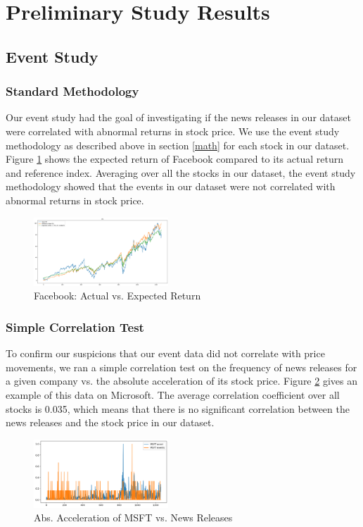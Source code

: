 \documentclass[conference]{IEEEtran}
\begin{document}
\section{Preliminary Study Results}
\subsection{Event Study}
\subsubsection{Standard Methodology}
Our event study had the goal of investigating if the news releases in our dataset were correlated with abnormal returns in stock price. We use the event study methodology as described above in section \ref{math} for each stock in our dataset. Figure \ref{fig:expected} shows the expected return of Facebook compared to its actual return and reference index. Averaging over all the stocks in our dataset, the event study methodology showed that the events in our dataset were not correlated with abnormal returns in stock price.
\begin{figure}[ht]
    \centering
    \includegraphics[width=0.45\textwidth]{FBExpectedValues.png}
    \caption{Facebook: Actual vs. Expected Return}
    \label{fig:expected}
\end{figure} 
\subsubsection{Simple Correlation Test}
To confirm our suspicions that our event data did not correlate with price movements, we ran a simple correlation test on the frequency of news releases for a given company vs. the absolute acceleration of its stock price. Figure \ref{fig:acceleartion} gives an example of this data on Microsoft. The average correlation coefficient over all stocks is 0.035, which means that there is no significant correlation between the news releases and the stock price in our dataset.
\begin{figure}[ht]
    \centering
    \includegraphics[width=0.45\textwidth]{MSFTevents.png}
    \caption{Abs. Acceleration of MSFT vs. News Releases}
    \label{fig:acceleartion}
\end{figure}
\end{document}
